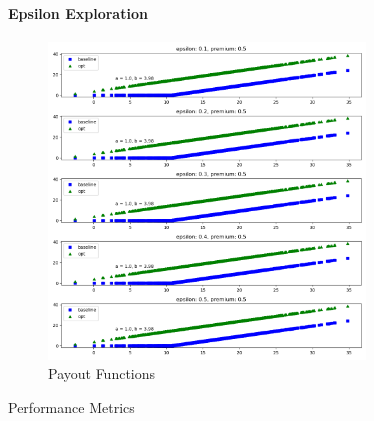 \documentclass[11pt]{article}
\begin{document}
            \paragraph*{Epsilon Exploration}
                \begin{figure}[H]
                    \centering
                    \caption{Payout Functions}
                    \includegraphics[width=0.75\textwidth]{../../output/figures/CVaR2/epsilon_exploration_full.png}
                \end{figure}

                \begin{table}[H]
                    \centering
                    \caption{Performance Metrics}
                    
                \end{table}

                \FloatBarrier
\end{document}
